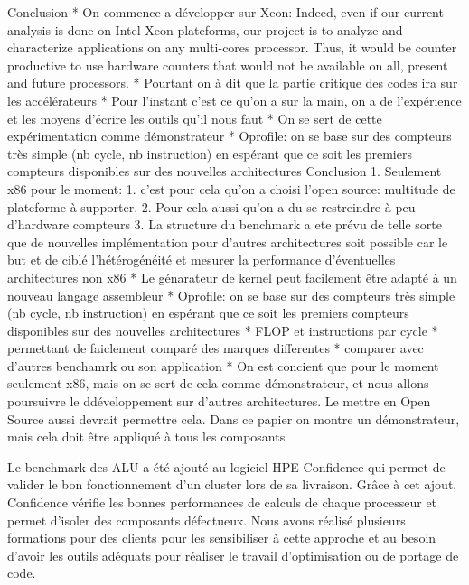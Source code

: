Conclusion
	* On commence a développer sur Xeon:
		Indeed, even if our current analysis is done on Intel Xeon plateforms, our project is to analyze and characterize applications on any multi-cores processor. Thus, it would be counter productive to use hardware counters that would not be available on all, present and future processors.
		    * Pourtant on à dit que la partie critique des codes ira sur les accélérateurs
		    * Pour l’instant c’est ce qu’on a sur la main, on a de l’expérience et les moyens d’écrire les outils qu’il nous faut
		    * On se sert de cette expérimentation comme démonstrateur
		        * Oprofile: on se base sur des compteurs très simple (nb cycle, nb instruction) en espérant que ce soit les premiers compteurs disponibles sur des nouvelles architectures
	Conclusion
		1. Seulement x86 pour le moment: 
			    1. c’est pour cela qu’on a choisi l’open source: multitude de plateforme à supporter. 
			    2. Pour cela aussi qu’on a du se restreindre à peu d’hardware compteurs
			    3. La structure du benchmark a ete prévu de telle sorte que de nouvelles implémentation pour d’autres architectures soit possible car le but et de ciblé l’hétérogénéité et mesurer la performance d’éventuelles architectures non x86
				        * Le génarateur de kernel peut facilement être adapté à un nouveau langage assembleur
				        * Oprofile: on se base sur des compteurs très simple (nb cycle, nb instruction) en espérant que ce soit les premiers compteurs disponibles sur des nouvelles architectures
			    * FLOP et instructions par cycle
				        * permettant de faiclement comparé des marques differentes
				        * comparer avec d’autres benchamrk ou son application
			* On est concient que pour le moment seulement x86, mais on se sert de cela comme démonstrateur, et nous allons poursuivre le ddéveloppement sur d’autres architectures. Le mettre en Open Source aussi devrait permettre cela.
		Dans ce papier on montre un démonstrateur, mais cela doit être appliqué à tous les composants
		
		
Le benchmark des ALU a été ajouté au logiciel HPE Confidence qui permet de valider le bon fonctionnement d’un cluster lors de sa livraison. Grâce à cet ajout, Confidence vérifie les bonnes performances de calculs de chaque processeur et permet d’isoler des composants défectueux. Nous avons réalisé plusieurs formations pour des clients pour les sensibiliser à cette approche et au besoin d’avoir les outils adéquats pour réaliser le travail d’optimisation ou de portage de code. 


